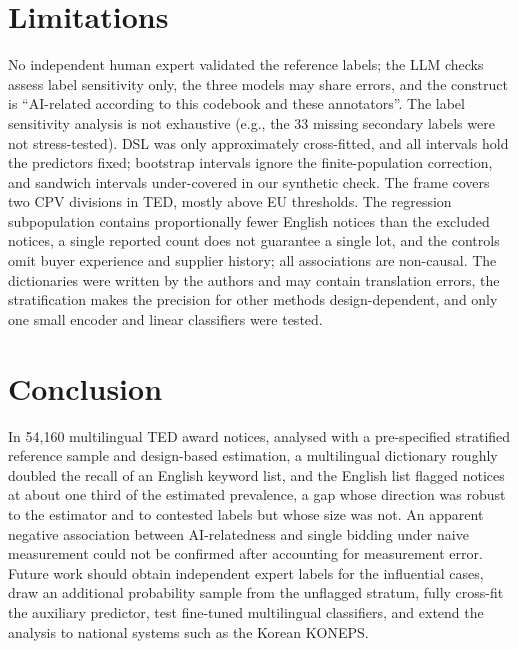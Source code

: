 \documentclass[runningheads]{llncs}
\begin{document}
\section{Limitations}
No independent human expert validated the reference labels; the LLM checks assess label sensitivity only, the three models may share errors, and the construct is ``AI-related according to this codebook and these annotators''. The label sensitivity analysis is not exhaustive (e.g., the 33 missing secondary labels were not stress-tested). DSL was only approximately cross-fitted, and all intervals hold the predictors fixed; bootstrap intervals ignore the finite-population correction, and sandwich intervals under-covered in our synthetic check. The frame covers two CPV divisions in TED, mostly above EU thresholds. The regression subpopulation contains proportionally fewer English notices than the excluded notices, a single reported count does not guarantee a single lot, and the controls omit buyer experience and supplier history; all associations are non-causal. The dictionaries were written by the authors and may contain translation errors, the stratification makes the precision for other methods design-dependent, and only one small encoder and linear classifiers were tested.

\section{Conclusion}
In 54,160 multilingual TED award notices, analysed with a pre-specified stratified reference sample and design-based estimation, a multilingual dictionary roughly doubled the recall of an English keyword list, and the English list flagged notices at about one third of the estimated prevalence, a gap whose direction was robust to the estimator and to contested labels but whose size was not. An apparent negative association between AI-relatedness and single bidding under naive measurement could not be confirmed after accounting for measurement error. Future work should obtain independent expert labels for the influential cases, draw an additional probability sample from the unflagged stratum, fully cross-fit the auxiliary predictor, test fine-tuned multilingual classifiers, and extend the analysis to national systems such as the Korean KONEPS.
\end{document}
